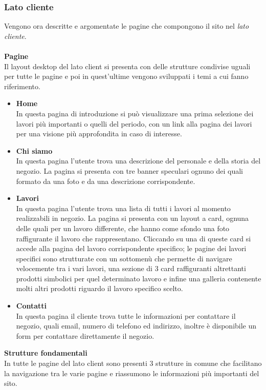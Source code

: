 \subsubsection{Lato cliente}
Vengono ora descritte e argomentate le pagine che compongono il sito nel \textit{lato cliente}.\\\\
\textbf{Pagine}\\
Il layout desktop del lato client si presenta con delle strutture condivise uguali per tutte le pagine e poi in quest'ultime vengono sviluppati i temi a cui fanno riferimento.
	\begin{itemize}
		\item \textbf{Home} \\In questa pagina di introduzione si può visualizzare una prima selezione dei lavori più importanti o quelli del periodo, con un link alla pagina dei lavori per una visione più approfondita in caso di interesse.
		\item \textbf{Chi siamo}\\In questa pagina l'utente trova una descrizione del personale e della storia del negozio. La pagina si presenta con tre banner speculari ognuno dei quali formato da una foto e da una descrizione corrispondente.
		\item \textbf{Lavori}\\In questa pagina l'utente trova una lista di tutti i lavori al momento realizzabili in negozio. La pagina si presenta con un layout a card, ognuna delle quali per un lavoro differente, che hanno come sfondo una foto raffigurante il lavoro che rappresentano. Cliccando su una di queste card si accede alla pagina del lavoro corrispondente specifico; le pagine dei lavori specifici sono strutturate con un sottomenù che permette di navigare velocemente tra i vari lavori, una sezione di 3 card raffiguranti altrettanti prodotti simbolici per quel determinato lavoro e infine una galleria contenente molti altri prodotti riguardo il lavoro specifico scelto.
	 	\item \textbf{Contatti}\\In questa pagina il cliente trova tutte le informazioni per contattare il negozio, quali email, numero di telefono ed indirizzo, inoltre è disponibile un form per contattare direttamente il negozio.
 	\end{itemize}
\textbf{Strutture fondamentali}\\ 
In tutte le pagine del lato client sono presenti 3 strutture in comune che facilitano la navigazione tra le varie pagine e riassumono le informazioni più importanti del sito.
